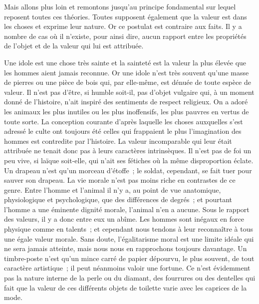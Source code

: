 \documentclass[french,twoside]{book} %
\begin{document}
Mais allons plus loin et remontons jusqu’au principe fondamental sur lequel reposent toutes ces théories. Toutes supposent également que la valeur est dans les choses et exprime leur nature. Or ce postulat est contraire aux faits. Il y a nombre de cas où il n’existe, pour ainsi dire, aucun rapport entre les propriétés de l’objet et de la valeur qui lui est attribuée.\par
Une idole est une chose très sainte et la sainteté est la valeur la plus élevée que les hommes aient jamais reconnue. Or une idole n’est très souvent qu’une masse de pierres ou une pièce de bois qui, par elle-même, est dénuée de toute espèce de valeur. Il n’est pas d’être, si humble soit-il, pas d’objet vulgaire qui, à un moment donné de l’histoire, n’ait inspiré des sentiments de respect religieux. On a adoré les animaux les plus inutiles ou les plus inoffensifs, les plus pauvres en vertus de toute sorte. La conception courante d’après laquelle les choses auxquelles s’est adressé le culte ont toujours été celles qui frappaient le plus l’imagination des hommes est contredite par l’histoire. La valeur incomparable qui leur était attribuée ne tenait donc pas à leurs caractères intrinsèques. Il n’est pas de foi un peu vive, si laïque soit-elle, qui n’ait ses fétiches où la même disproportion éclate. Un drapeau n’est qu’un morceau d’étoffe ; le soldat, cependant, se fait tuer pour sauver son drapeau. La vie morale n’est pas moins riche en contrastes de ce genre. Entre l’homme et l’animal il n’y a, au point de vue anatomique, physiologique et psychologique, que des différences de degrés ; et pourtant l’homme a une éminente dignité morale, l’animal n’en a aucune. Sous le rapport des valeurs, il y a donc entre eux un abîme. Les hommes sont inégaux en force physique comme en talents ; et cependant nous tendons à leur reconnaître à tous une égale valeur morale. Sans doute, l’égalitarisme moral est une limite idéale qui ne sera jamais atteinte, mais nous nous en rapprochons toujours davantage. Un timbre-poste n’est qu’un mince carré de papier dépourvu, le plus souvent, de tout caractère artistique ; il peut néanmoins valoir une fortune. Ce n’est évidemment pas la nature interne de la perle ou du diamant, des fourrures ou des dentelles qui fait que la valeur de ces différents objets de toilette varie avec les caprices de la mode.
\end{document}
